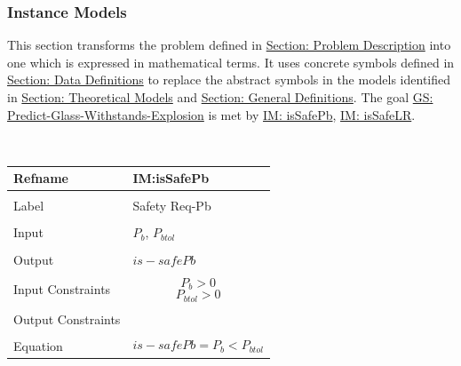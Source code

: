 \documentclass[12pt]{article}
\begin{document}
\subsubsection{Instance Models}
\label{Sec:IMs}
This section transforms the problem defined in \hyperref[Sec:ProbDesc]{Section: Problem Description} into one which is expressed in mathematical terms. It uses concrete symbols defined in \hyperref[Sec:DDs]{Section: Data Definitions} to replace the abstract symbols in the models identified in \hyperref[Sec:TMs]{Section: Theoretical Models} and \hyperref[Sec:GDs]{Section: General Definitions}.
The goal \hyperref[willBreakGS]{GS: Predict-Glass-Withstands-Explosion} is met by \hyperref[IM:isSafePb]{IM: isSafePb}, \hyperref[IM:isSafeLR]{IM: isSafeLR}.
\par~

\noindent \begin{minipage}{\textwidth}
          \begin{tabular}{>{\raggedright}p{}>{\raggedright\arraybackslash}p{}}
          \toprule \textbf{Refname} & \textbf{IM:isSafePb}
          \label{IM:isSafePb}
          \\ \midrule \\
          Label & Safety Req-Pb
          \\ \midrule \\
          Input & ${P_{b}}$, ${P_{btol}}$
          \\ \midrule \\
          Output & $is-safePb$
          \\ \midrule \\
          Input Constraints & \begin{displaymath}
                              {P_{b}}>0
                              \end{displaymath}
                              \begin{displaymath}
                              {P_{btol}}>0
                              \end{displaymath}
          \\ \midrule \\
          Output Constraints & 
          \\ \midrule \\
          Equation & \begin{displaymath}
                     is-safePb={P_{b}}<{P_{btol}}
                     \end{displaymath}

\end{tabular}
\end{minipage}
\end{document}
